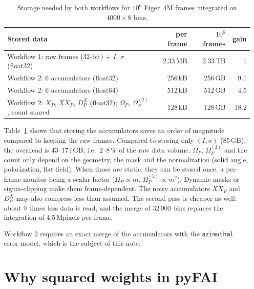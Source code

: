 \documentclass[a4paper,11pt]{article}
\newcommand{\Om}{\Omega}
\newcommand{\OmS}{\Omega^{(2)}}
\newcommand{\D}[2]{D^{#1}_{#2}}
\begin{document}
\begin{table}[ht]
\centering
\small
\begin{tabular}{lrrr}
\toprule
Stored data & per frame & $10^6$ frames & gain \\
\midrule
Workflow 1: raw frames (32-bit) $+$ $I$, $\sigma$ (float32) & 2.33\,MB & 2.33\,TB & 1 \\
Workflow 2: 6 accumulators (float32) & 256\,kB & 256\,GB & 9.1 \\
Workflow 2: 6 accumulators (float64) & 512\,kB & 512\,GB & 4.5 \\
Workflow 2: $X_P$, $XX_P$, $\D{X}{P}$ (float32); $\Om_P$, $\OmS_P$, count shared & 128\,kB & 128\,GB & 18.2 \\
\bottomrule
\end{tabular}
\caption{Storage needed by both workflows for $10^6$ Eiger~4M frames integrated on $4000\times8$ bins.}
\label{tab:storage}
\end{table}

Table~\ref{tab:storage} shows that storing the accumulators saves an order of magnitude compared to
keeping the raw frames. Compared to storing only $(I,\sigma)$ (85\,GB), the overhead is 43--171\,GB,
i.e.\ 2--8\,\% of the raw data volume. $\Om_P$, $\OmS_P$ and the count only depend on the geometry, the
mask and the normalization (solid angle, polarization, flat-field). When those are static, they can be
stored once, a per-frame monitor being a scalar factor ($\Om_P\propto m$, $\OmS_P\propto m^2$). Dynamic
masks or sigma-clipping make them frame-dependent. The noisy accumulators $XX_P$ and $\D{X}{P}$ may also
compress less than assumed. The second pass is cheaper as well: about 9 times less data is read, and
the merge of $32\,000$ bins replaces the integration of $4.5$\,Mpixels per frame.

Workflow 2 requires an exact merge of the accumulators with the \texttt{azimuthal} error model, which
is the subject of this note.

\section{Why squared weights in pyFAI}
\end{document}
